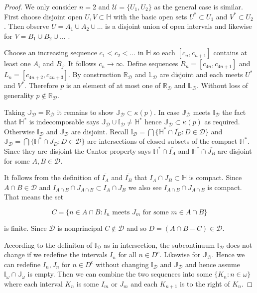 \documentclass[12pt]{article}
\theoremstyle{plain}
\theoremstyle{definition}
\newcommand{\K}{\ensuremath{\kappa}}
\newcommand{\W}{\ensuremath{\omega}}
\newcommand{\RR}{\ensuremath{\mathbb R}}
\newcommand{\II}{\ensuremath{\mathbb I}}
\newcommand{\JJ}{\ensuremath{\mathbb J}}
\newcommand{\LL}{\ensuremath{\mathbb L}}
\newcommand{\HH}{\ensuremath{\mathbb H}}
\newcommand{\0}{\ensuremath{\varnothing}}
\newcommand{\cD}{\ensuremath{\mathcal D}}
\newcommand{\cU}{\ensuremath{\mathcal U}}
\begin{document}
\begin{proof}
We only consider $n=2$ and $\cU=\{U_1,U_2\}$ as the general case is similar.
First choose disjoint open $U,V \subset \HH$ with the basic open sets $U^* \subset U_1$ and $V^* \subset U_2$.
Then observe $U= A_1 \cup A_2 \cup \ldots$ is a disjoint union of open intervals and likewise for $V= B_1 \cup B_2 \cup \ldots$ .

Choose an increasing sequence $c_1<c_2 < \ldots$ in $\HH$ so each $[c_n,c_{n+1}]$ contains at least one $A_i$ and $B_j$.
It follows $c_n \to \infty$.
Define sequences $R_n = [c_{4n}, c_{4n+1}]$ and $L_n = [c_{4n+2}, c_{4n+3}]$.
By construction $\RR_\cD$ and $\LL_\cD$ are disjoint and each meets $U^*$ and $V^*$.
Therefore $p$ is an element of at most one of $\RR_\cD$ and $\LL_\cD$.
Without loss of generality $p \notin \RR_\cD$.

Taking $\JJ_\cD = \RR_\cD$ it remains to show $\JJ_\cD \subset \K(p)$.
In case $\JJ_\cD$ meets $\II_\cD$ the fact that $\HH^*$ is indecomposable says $\JJ_\cD \cup \II_\cD \ne \HH^*$ hence $\JJ_\cD \subset \K(p)$ as required. 
Otherwise $\II_\cD$ and $\JJ_\cD$ are disjoint. Recall 
$\II_\cD =\bigcap \big \{\HH^* \cap \overline{I_D} : D \in \cD \big \}$ and 
$\JJ_\cD =\bigcap \big \{\HH^* \cap \overline{J_D} : D \in \cD \big \}$ are intersections of closed subsets of the compact $\HH^*$. Since they are disjoint the Cantor property says $\HH^* \cap \overline{I_A}$ and $\HH^* \cap \overline{J_B}$ are disjoint for some $A,B \in \cD$. 

It follows from the definition of $\overline{I_A}$ and $\overline{I_B}$ that $I_A \cap J_B \subset \HH$ is compact. Since $A \cap B \in \cD$ and $I_{A \cap B} \cap J_{A \cap B} \subset I_A \cap J_B$ we also see $I_{A \cap B} \cap J_{A \cap B}$ is compact. That means the set

$$ C = \{n \in A \cap B: I_n \text{ meets } J_m \text{ for some } m \in A \cap B\}$$

is finite. Since $\cD$ is nonprincipal $C \notin \cD$ and so $D = (A \cap B - C) \in \cD$.

According to the definiton of $\II_\cD$ as in intersection, the subcontinuum $\II_\cD$ does not change if we redefine the intervals $I_n$ for all $n \in D^c$. Likewise for $\JJ_\cD$.
Hence we can redefine $I_n,J_n$ for $n \in D^c$ without changing $\II_\cD$ and $\JJ_\cD$ and hence assume $\II_\W \cap \JJ_\W$ is empty. 
Then we can combine the two sequences into some $\{K_n: n \in \W \}$ where each interval $K_n$ is some $I_m$ or $J_m$ and each $K_{n+1}$ is to the right of $K_n$. 


\end{proof}
\end{document}
